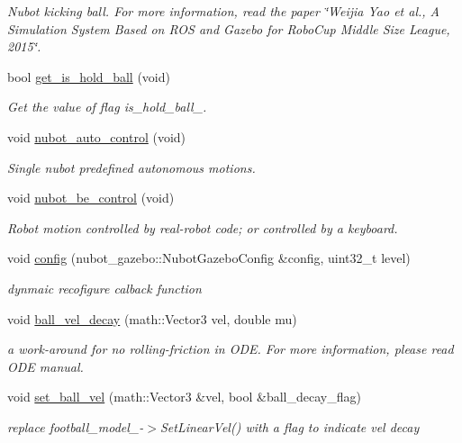 \begin{DoxyCompactItemize}
\begin{DoxyCompactList}\small\item\em Nubot kicking ball. For more information, read the paper \char`\"{}\-Weijia Yao et al., A Simulation System Based on R\-O\-S and Gazebo for Robo\-Cup Middle Size League, 2015\char`\"{}. \end{DoxyCompactList}\item 
bool \hyperlink{classgazebo_1_1NubotGazebo_a8366f268f6bba085201123d74b786368}{get\-\_\-is\-\_\-hold\-\_\-ball} (void)
\begin{DoxyCompactList}\small\item\em Get the value of flag is\-\_\-hold\-\_\-ball\-\_\-. \end{DoxyCompactList}\item 
void \hyperlink{classgazebo_1_1NubotGazebo_a991cc13697cbd1eaf855d21e4f5d78d2}{nubot\-\_\-auto\-\_\-control} (void)
\begin{DoxyCompactList}\small\item\em Single nubot predefined autonomous motions. \end{DoxyCompactList}\item 
void \hyperlink{classgazebo_1_1NubotGazebo_aaa7835337bbfd120b5b85af40ccf47ae}{nubot\-\_\-be\-\_\-control} (void)
\begin{DoxyCompactList}\small\item\em Robot motion controlled by real-\/robot code; or controlled by a keyboard. \end{DoxyCompactList}\item 
void \hyperlink{classgazebo_1_1NubotGazebo_a828269281839a4f18d30f02d20ad62b6}{config} (nubot\-\_\-gazebo\-::\-Nubot\-Gazebo\-Config \&config, uint32\-\_\-t level)
\begin{DoxyCompactList}\small\item\em dynmaic recofigure calback function \end{DoxyCompactList}\item 
void \hyperlink{classgazebo_1_1NubotGazebo_a3a42f8965b7ccb35d0b6a0624c56ba86}{ball\-\_\-vel\-\_\-decay} (math\-::\-Vector3 vel, double mu)
\begin{DoxyCompactList}\small\item\em a work-\/around for no rolling-\/friction in O\-D\-E. For more information, please read O\-D\-E manual. \end{DoxyCompactList}\item 
void \hyperlink{classgazebo_1_1NubotGazebo_a5b5d4a3644867257cb379613072e9567}{set\-\_\-ball\-\_\-vel} (math\-::\-Vector3 \&vel, bool \&ball\-\_\-decay\-\_\-flag)
\begin{DoxyCompactList}\small\item\em replace football\-\_\-model\-\_\--\/$>$Set\-Linear\-Vel() with a flag to indicate vel decay \end{DoxyCompactList}\end{DoxyCompactItemize}
